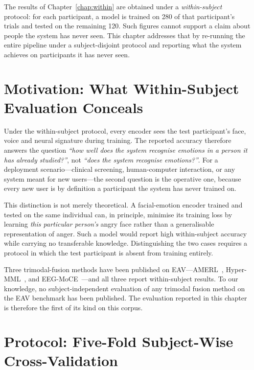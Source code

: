 The results of Chapter~\ref{chap:within} are obtained under a \emph{within-subject} protocol: for
each participant, a model is trained on 280 of that participant's trials and tested
on the remaining 120. Such figures cannot support a claim about people the system
has never seen. This chapter addresses that by re-running the entire pipeline under a subject-disjoint protocol and reporting what
the system achieves on participants it has never seen.

\section{Motivation: What Within-Subject Evaluation Conceals}
\label{sec:cs_motivation}

Under the within-subject protocol, every encoder sees the test participant's face,
voice and neural signature during training. The reported accuracy therefore answers
the question \emph{``how well does the system recognise emotions in a person it has
already studied?''}, not \emph{``does the system recognise emotions?''}. For a
deployment scenario---clinical screening, human-computer interaction, or any system meant for new users---the second question is the operative one,
because every new user is by definition a participant the system has never trained on.

This distinction is not merely theoretical. A facial-emotion encoder trained and
tested on the same individual can, in principle, minimise its training loss by
learning \emph{this particular person's} angry face rather than a generalisable
representation of anger. Such a model would report high within-subject accuracy while
carrying no transferable knowledge. Distinguishing the two cases requires a protocol
in which the test participant is absent from training entirely.

Three trimodal-fusion methods have been published on
EAV---AMERL~\cite{Yin2024AMERL}, Hyper-MML~\cite{Kang2025HyperMML}, and
EEG-MoCE~\cite{Anon2026EEGMoCE}---and all three report within-subject results.
To our knowledge, no subject-independent evaluation of any trimodal fusion method on
the EAV benchmark has been published. The evaluation reported in this chapter is
therefore the first of its kind on this corpus.

\section{Protocol: Five-Fold Subject-Wise Cross-Validation}
\label{sec:cs_protocol}


